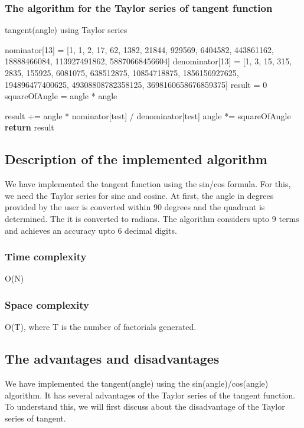 \documentclass[paper=a4, fontsize=11pt,twoside]{scrartcl}	%
\begin{document}
    \subsubsection{The algorithm for the Taylor series of tangent function}
    \begin{algorithm}[H]
    	\caption{tangent(angle) using Taylor series} 
    	\begin{algorithmic}[1]
            \State nominator[13] = [1, 1, 2, 17, 62, 1382, 21844, 929569, 6404582, 443861162, 18888466084, 113927491862, 58870668456604]
            \State denominator[13] = [1, 3, 15, 315, 2835, 155925, 6081075, 638512875, 10854718875, 1856156927625, 194896477400625, 49308808782358125, 3698160658676859375]
        \State result = 0
        \State squareOfAngle = angle * angle
    
            \State result += angle * nominator[test] / denominator[test]
            \State angle *= squareOfAngle
        \EndFor
        \State \textbf{return} result
    	\end{algorithmic} 
    \end{algorithm}
    \subsection{Description of the implemented algorithm}
    We have implemented the tangent function using the sin/cos formula. For this, we need the Taylor series for sine and cosine. At first, the angle in degrees provided by the user is converted within 90 degrees and the quadrant is determined. The it is converted to radians. The algorithm considers upto 9 terms and achieves an accuracy upto 6 decimal digits.
    \subsubsection{Time complexity}
    O(N)
    \subsubsection{Space complexity}
    O(T), where T is the number of factorials generated.
    \subsection{The advantages and disadvantages}
    We have implemented the tangent(angle) using the sin(angle)/cos(angle) algorithm. It has several advantages of the Taylor series of the tangent function. To understand this, we will first discuss about the disadvantage of the Taylor series of tangent.
\end{document}
